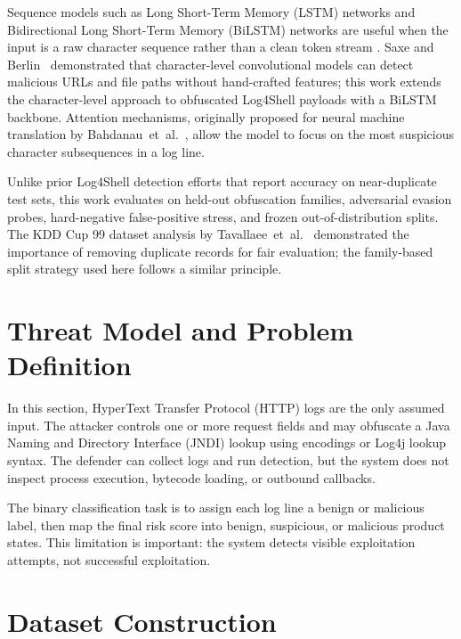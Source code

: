 \documentclass[conference]{IEEEtran}
\begin{document}
Sequence models such as Long Short-Term Memory (LSTM) networks and
Bidirectional Long Short-Term Memory (BiLSTM) networks are useful when the
input is a raw character sequence rather than a clean token stream
\cite{hochreiter1997,graves2013}. Saxe and Berlin~\cite{saxe2017}
demonstrated that character-level convolutional models can detect malicious
URLs and file paths without hand-crafted features; this work extends the
character-level approach to obfuscated Log4Shell payloads with a BiLSTM
backbone. Attention mechanisms, originally proposed for neural machine
translation by Bahdanau~et~al.~\cite{bahdanau2015}, allow the model to
focus on the most suspicious character subsequences in a log line.

Unlike prior Log4Shell detection efforts that report accuracy on
near-duplicate test sets, this work evaluates on held-out obfuscation
families, adversarial evasion probes, hard-negative false-positive stress,
and frozen out-of-distribution splits. The KDD Cup 99 dataset analysis by
Tavallaee~et~al.~\cite{kdd_analysis} demonstrated the importance of
removing duplicate records for fair evaluation; the family-based split
strategy used here follows a similar principle.

\section{Threat Model and Problem Definition}

In this section, HyperText Transfer Protocol (HTTP) logs are the only assumed
input. The attacker controls one or more request fields and may obfuscate a
Java Naming and Directory Interface (JNDI) lookup using encodings or Log4j
lookup syntax. The defender can collect logs and run detection, but the system
does not inspect process execution, bytecode loading, or outbound callbacks.

The binary classification task is to assign each log line a benign or
malicious label, then map the final risk score into benign, suspicious, or
malicious product states. This limitation is important: the system detects
visible exploitation attempts, not successful exploitation.

\section{Dataset Construction}
\end{document}
